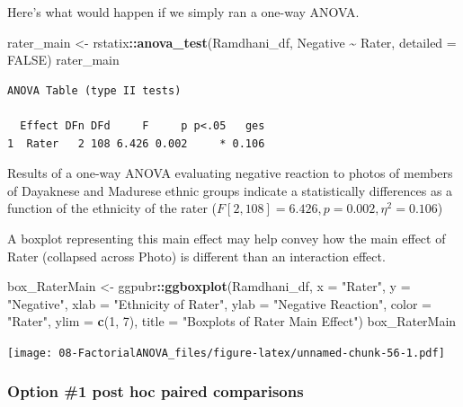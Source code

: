 \documentclass[
  11pt,
]{book}
\newenvironment{Shaded}{\begin{snugshade}}{\end{snugshade}}
\newcommand{\AttributeTok}[1]{\textcolor[rgb]{0.27,0.27,0.27}{#1}}
\newcommand{\ConstantTok}[1]{\textcolor[rgb]{0.37,0.37,0.37}{#1}}
\newcommand{\DecValTok}[1]{\textcolor[rgb]{0.06,0.06,0.06}{#1}}
\newcommand{\FunctionTok}[1]{\textcolor[rgb]{0.27,0.27,0.27}{\textbf{#1}}}
\newcommand{\NormalTok}[1]{#1}
\newcommand{\OtherTok}[1]{\textcolor[rgb]{0.37,0.37,0.37}{#1}}
\newcommand{\SpecialCharTok}[1]{\textcolor[rgb]{0.43,0.43,0.43}{\textbf{#1}}}
\newcommand{\StringTok}[1]{\textcolor[rgb]{0.5,0.5,0.5}{#1}}
\begin{document}
Here's what would happen if we simply ran a one-way ANOVA.

\begin{Shaded}
\begin{Highlighting}[]
\NormalTok{rater\_main }\OtherTok{\textless{}{-}}\NormalTok{ rstatix}\SpecialCharTok{::}\FunctionTok{anova\_test}\NormalTok{(Ramdhani\_df, Negative }\SpecialCharTok{\textasciitilde{}}\NormalTok{ Rater, }\AttributeTok{detailed =} \ConstantTok{FALSE}\NormalTok{)}
\NormalTok{rater\_main}
\end{Highlighting}
\end{Shaded}

\begin{verbatim}
ANOVA Table (type II tests)

  Effect DFn DFd     F     p p<.05   ges
1  Rater   2 108 6.426 0.002     * 0.106
\end{verbatim}

Results of a one-way ANOVA evaluating negative reaction to photos of members of Dayaknese and Madurese ethnic groups indicate a statistically differences as a function of the ethnicity of the rater (\(F[2, 108] = 6.426, p = 0.002, \eta^2 = 0.106\))

A boxplot representing this main effect may help convey how the main effect of Rater (collapsed across Photo) is different than an interaction effect.

\begin{Shaded}
\begin{Highlighting}[]
\NormalTok{box\_RaterMain }\OtherTok{\textless{}{-}}\NormalTok{ ggpubr}\SpecialCharTok{::}\FunctionTok{ggboxplot}\NormalTok{(Ramdhani\_df, }\AttributeTok{x =} \StringTok{"Rater"}\NormalTok{, }\AttributeTok{y =} \StringTok{"Negative"}\NormalTok{,}
    \AttributeTok{xlab =} \StringTok{"Ethnicity of Rater"}\NormalTok{, }\AttributeTok{ylab =} \StringTok{"Negative Reaction"}\NormalTok{, }\AttributeTok{color =} \StringTok{"Rater"}\NormalTok{,}
    \AttributeTok{ylim =} \FunctionTok{c}\NormalTok{(}\DecValTok{1}\NormalTok{, }\DecValTok{7}\NormalTok{), }\AttributeTok{title =} \StringTok{"Boxplots of Rater Main Effect"}\NormalTok{)}
\NormalTok{box\_RaterMain}
\end{Highlighting}
\end{Shaded}

\texttt{[image: 08-FactorialANOVA\_files/figure-latex/unnamed-chunk-56-1.pdf]}

\hypertarget{option-1-post-hoc-paired-comparisons}{%
\subsubsection{Option \#1 post hoc paired comparisons}\label{option-1-post-hoc-paired-comparisons}}
\end{document}
